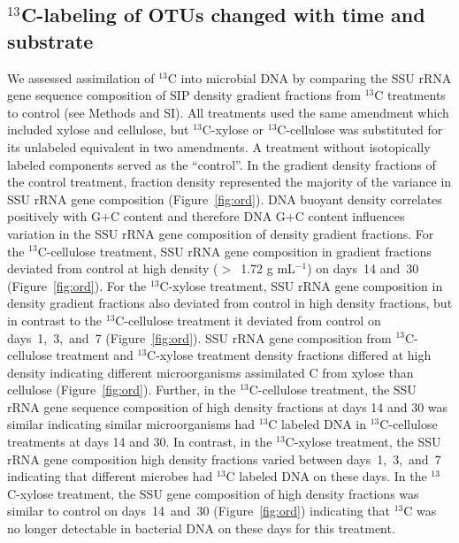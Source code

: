 \subsection{$^{13}$C-labeling of OTUs changed with time and substrate}
We assessed assimilation of $^{13}$C into microbial DNA by comparing the SSU
rRNA gene sequence composition of SIP density gradient fractions from $^{13}$C
treatments to control (see Methods and SI). All treatments used the same
amendment which included xylose and cellulose, but $^{13}$C-xylose or
$^{13}$C-cellulose was substituted for its unlabeled equivalent in two
amendments. A treatment without isotopically labeled components served as the
``control''. In the gradient density fractions of the control treatment,
fraction density represented the majority of the variance in SSU rRNA gene
composition (Figure~\ref{fig:ord}). DNA buoyant density correlates positively
with G$+$C content \citep{Buckley_2007} and therefore DNA G$+$C content
influences variation in the SSU rRNA gene composition of density gradient
fractions. For the $^{13}$C-cellulose treatment, SSU rRNA gene composition in
gradient fractions deviated from control at high density ($>$~1.72 g mL$^{-1}$)
on days~14 and~30 (Figure~\ref{fig:ord}). For the $^{13}$C-xylose treatment,
SSU rRNA gene composition in density gradient fractions also deviated from
control in high density fractions, but in contrast to the $^{13}$C-cellulose
treatment it deviated from control on days~1,~3,~and~7 (Figure~\ref{fig:ord}).
SSU rRNA gene composition from $^{13}$C-cellulose treatment and $^{13}$C-xylose
treatment density fractions differed at high density indicating different
microorganisms assimilated C from xylose than cellulose (Figure~\ref{fig:ord}).
Further, in the $^{13}$C-cellulose treatment, the SSU rRNA gene sequence
composition of high density fractions at days 14 and 30 was similar indicating
similar microorganisms had $^{13}$C labeled DNA in $^{13}$C-cellulose
treatments at days 14 and 30. In contrast, in the $^{13}$C-xylose treatment,
the SSU rRNA gene composition high density fractions varied between
days~1,~3,~and~7 indicating that different microbes had $^{13}$C labeled DNA on
these days. In the $^{13}$C-xylose treatment, the SSU gene composition of high
density fractions was similar to control on days~14~and~30
(Figure~\ref{fig:ord}) indicating that $^{13}$C was no longer detectable in
bacterial DNA on these days for this treatment. 

